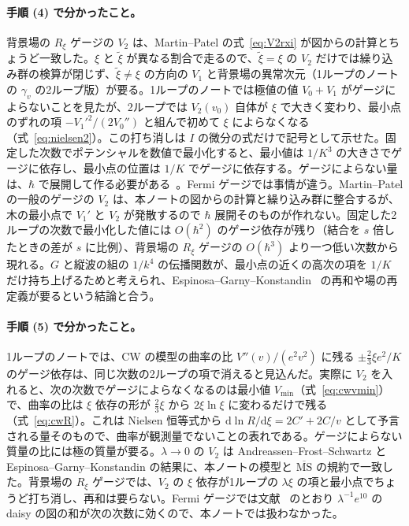 \documentclass[a4paper,10pt]{ltjsarticle}
\newcommand{\dd}{\mathrm{d}}
\newcommand{\MSbar}{\overline{\mathrm{MS}}}
\begin{document}
\paragraph{手順 (4) で分かったこと。}背景場の $R_\xi$ ゲージの $V_2$ は、Martin--Patel の式~\eqref{eq:V2rxi} が図からの計算とちょうど一致した。$\xi$ と $\tilde\xi$ が異なる割合で走るので、$\tilde\xi=\xi$ の $V_2$ だけでは繰り込み群の検算が閉じず、$\tilde\xi\ne\xi$ の方向の $V_1$ と背景場の異常次元（1ループのノートの $\gamma_v$ の2ループ版）が要る。1ループのノートでは極値の値 $V_0+V_1$ がゲージによらないことを見たが、2ループでは $V_2(v_0)$ 自体が $\xi$ で大きく変わり、最小点のずれの項 $-V_1'^2/(2V_0'')$ と組んで初めて $\xi$ によらなくなる（式~\eqref{eq:nielsen2}）。この打ち消しは $I$ の微分の式だけで記号として示せた。固定した次数でポテンシャルを数値で最小化すると、最小値は $1/K^3$ の大きさでゲージに依存し、最小点の位置は $1/K$ でゲージに依存する。ゲージによらない量は、$\hbar$ で展開して作る必要がある~\cite{afs15,pr11}。Fermi ゲージでは事情が違う。Martin--Patel の一般のゲージの $V_2$ は、本ノートの図からの計算と繰り込み群に整合するが、木の最小点で $V_1'$ と $V_2$ が発散するので $\hbar$ 展開そのものが作れない。固定した2ループの次数で最小化した値には $O(\hbar^2)$ のゲージ依存が残り（結合を $s$ 倍したときの差が $s$ に比例）、背景場の $R_\xi$ ゲージの $O(\hbar^3)$ より一つ低い次数から現れる。$G$ と縦波の組の $1/k^4$ の伝播関数が、最小点の近くの高次の項を $1/K$ だけ持ち上げるためと考えられ、Espinosa--Garny--Konstandin~\cite{egk16} の再和や場の再定義が要るという結論と合う。

\paragraph{手順 (5) で分かったこと。}1ループのノートでは、CW の模型の曲率の比 $V''(v)/(e^2v^2)$ に残る $\pm\frac23\xi e^2/K$ のゲージ依存は、同じ次数の2ループの項で消えると見込んだ。実際に $V_2$ を入れると、次の次数でゲージによらなくなるのは最小値 $V_{\min}$（式~\eqref{eq:cwvmin}）で、曲率の比は $\xi$ 依存の形が $\frac23\xi$ から $2\xi\ln\xi$ に変わるだけで残る（式~\eqref{eq:cwR}）。これは Nielsen 恒等式から $\dd\ln R/\dd\xi=2C'+2C/v$ として予言される量そのもので、曲率が観測量でないことの表れである。ゲージによらない質量の比には極の質量が要る。$\lambda\to0$ の $V_2$ は Andreassen--Frost--Schwartz と Espinosa--Garny--Konstandin の結果に、本ノートの模型と $\MSbar$ の規約で一致した。背景場の $R_\xi$ ゲージでは、$V_2$ の $\xi$ 依存が1ループの $\lambda\xi$ の項と最小点でちょうど打ち消し、再和は要らない。Fermi ゲージでは文献~\cite{afs15} のとおり $\lambda^{-1}e^{10}$ の daisy の図の和が次の次数に効くので、本ノートでは扱わなかった。
\end{document}
